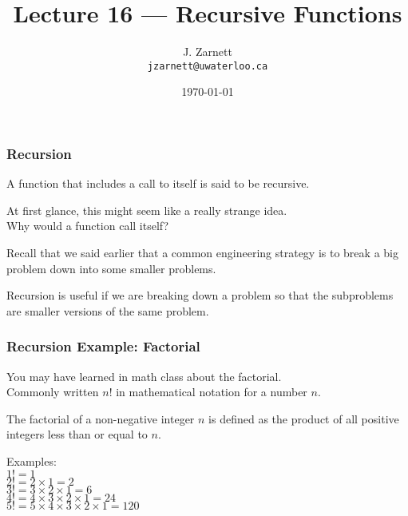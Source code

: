 

\title{Lecture 16 --- Recursive Functions }

\author{J. Zarnett\\
\texttt{jzarnett@uwaterloo.ca}}
\date{\today}



\begin{frame}
  \titlepage
  
 \end{frame}

\begin{frame}
\frametitle{Recursion}

A function that includes a call to itself is said to be \alert{recursive}.

At first glance, this might seem like a really strange idea.\\
\quad Why would a function call itself?

Recall that we said earlier that a common engineering strategy is to break a big problem down into some smaller problems.

Recursion is useful if we are breaking down a problem so that the subproblems are smaller versions of the same problem.

\end{frame}

\begin{frame}
\frametitle{Recursion Example: Factorial}

You may have learned in math class about the factorial.\\
\quad Commonly written $n!$ in mathematical notation for a number $n$.

The factorial of a non-negative integer $n$ is defined as the product of all positive integers less than or equal to $n$.

Examples: \\
\quad $1! = 1$\\
\quad $2! = 2 \times 1 = 2$\\
\quad $3! = 3 \times 2 \times 1 = 6$\\
\quad $4! = 4 \times 3 \times 2 \times 1 = 24$\\
\quad $5! = 5 \times 4 \times 3 \times 2 \times 1 = 120$

\end{frame}

